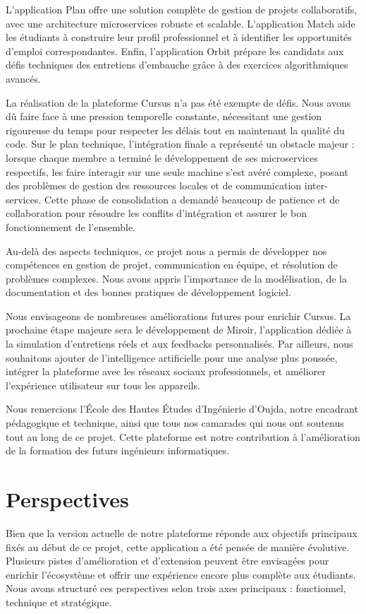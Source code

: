 \documentclass[12pt,a4paper]{report}
\newcommand{\headingfont}{}
\begin{document}
    L'application Plan offre une solution complète de gestion de projets collaboratifs, avec une architecture microservices robuste et scalable. L'application Match aide les étudiants à construire leur profil professionnel et à identifier les opportunités d'emploi correspondantes. Enfin, l'application Orbit prépare les candidats aux défis techniques des entretiens d'embauche grâce à des exercices algorithmiques avancés.

    La réalisation de la plateforme Cursus n'a pas été exempte de défis. Nous avons dû faire face à une pression temporelle constante, nécessitant une gestion rigoureuse du temps pour respecter les délais tout en maintenant la qualité du code. Sur le plan technique, l'intégration finale a représenté un obstacle majeur : lorsque chaque membre a terminé le développement de ses microservices respectifs, les faire interagir sur une seule machine s'est avéré complexe, posant des problèmes de gestion des ressources locales et de communication inter-services. Cette phase de consolidation a demandé beaucoup de patience et de collaboration pour résoudre les conflits d'intégration et assurer le bon fonctionnement de l'ensemble.

    Au-delà des aspects techniques, ce projet nous a permis de développer nos compétences en gestion de projet, communication en équipe, et résolution de problèmes complexes. Nous avons appris l'importance de la modélisation, de la documentation et des bonnes pratiques de développement logiciel.

    Nous envisageons de nombreuses améliorations futures pour enrichir Cursus. La prochaine étape majeure sera le développement de Miroir, l'application dédiée à la simulation d'entretiens réels et aux feedbacks personnalisés. Par ailleurs, nous souhaitons ajouter de l'intelligence artificielle pour une analyse plus poussée, intégrer la plateforme avec les réseaux sociaux professionnels, et améliorer l'expérience utilisateur sur tous les appareils.

    Nous remercions l'École des Hautes Études d'Ingénierie d'Oujda, notre encadrant pédagogique et technique, ainsi que tous nos camarades qui nous ont soutenus tout au long de ce projet. Cette plateforme est notre contribution à l'amélioration de la formation des futurs ingénieurs informatiques.
	\newpage
	\chapter*{{\headingfont Perspectives}}
	Bien que la version actuelle de notre plateforme réponde aux objectifs principaux fixés au début de ce projet, cette application a été pensée de manière évolutive. Plusieurs pistes d'amélioration et d'extension peuvent être envisagées pour enrichir l'écosystème et offrir une expérience encore plus complète aux étudiants. Nous avons structuré ces perspectives selon trois axes principaux : fonctionnel, technique et stratégique.
	
\end{document}
